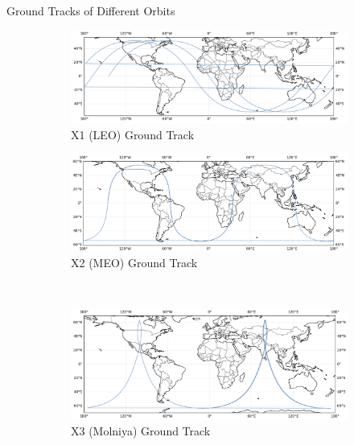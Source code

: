 \begin{hwkProblem}{3}{Ground Tracks of Different Orbits}
	\begin{figure}[H] \label{fig:s03a}
		\begin{center}
			\begin{subfigure}{0.4\textwidth} \label{fig:s03a1}
				\includegraphics[width=\linewidth]{./images/s03a1.png}
				\caption{X1 (LEO) Ground Track}
			\end{subfigure}
			\begin{subfigure}{0.4\textwidth} \label{fig:s03a2}
				\includegraphics[width=\linewidth]{./images/s03a2.png}
				\caption{X2 (MEO) Ground Track}
			\end{subfigure}
			\\
			\begin{subfigure}{0.4\textwidth} \label{fig:s03a3}
				\includegraphics[width=\linewidth]{./images/s03a3.png}
				\caption{X3 (Molniya) Ground Track}
			\end{subfigure}
			\begin{subfigure}{0.4\textwidth} \label{fig:s03a4}

\end{subfigure}
\end{center}
\end{figure}
\end{hwkProblem}
